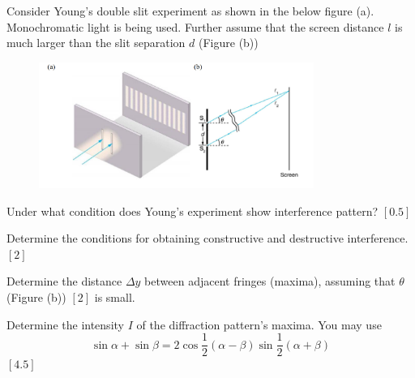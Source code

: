 \newpage
\begin{problem}
    Consider Young’s double slit experiment as shown in the below figure (a). Monochromatic light is being used. Further assume that the screen distance $l$ is much larger than the slit separation $d$ (Figure (b))
    \begin{figure}
        \centering
        \includegraphics[width = 0.8\textwidth]{spho_book_TYS_images/2021SPhO_10.png}
    \end{figure}
    \begin{subproblemalph}
        \item Under what condition does Young’s experiment show interference pattern? \hfill $[0.5]$
        \item Determine the conditions for obtaining constructive and destructive interference. \hfill $[2]$
        \item Determine the distance $\Delta y$ between adjacent fringes (maxima), assuming that $\theta$ (Figure (b)) \hfill $[2]$
is small.
        \item Determine the intensity $I$ of the diffraction pattern’s maxima. You may use \[\sin\alpha + \sin\beta = 2 \cos\frac{1}{2}\left(\alpha-\beta\right)\sin\frac{1}{2}\left(\alpha+\beta\right)\] \hfill $[4.5]$
    \end{subproblemalph}
\end{problem}